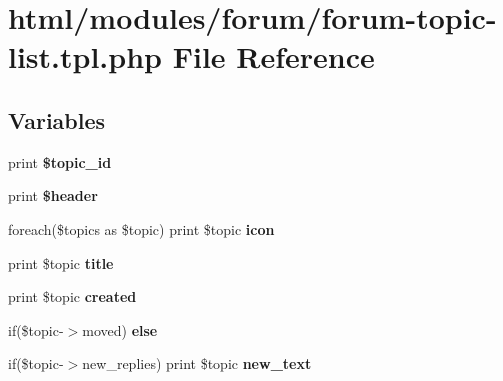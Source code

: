 \hypertarget{forum-topic-list_8tpl_8php}{
\section{html/modules/forum/forum-\/topic-\/list.tpl.php File Reference}
\label{forum-topic-list_8tpl_8php}
}
\subsection*{Variables}
\begin{DoxyCompactItemize}
\item 
\hypertarget{forum-topic-list_8tpl_8php_ad63adef8ed61a62f2c83572cd6273445}{
print {\bfseries \$topic\_\-id}}
\label{forum-topic-list_8tpl_8php_ad63adef8ed61a62f2c83572cd6273445}

\item 
\hypertarget{forum-topic-list_8tpl_8php_afdbae16fe43949b38217397064ddaf03}{
print {\bfseries \$header}}
\label{forum-topic-list_8tpl_8php_afdbae16fe43949b38217397064ddaf03}

\item 
\hypertarget{forum-topic-list_8tpl_8php_a77e5d07abebe3261741e5786016785e0}{
foreach(\$topics as \$topic) print \$topic {\bfseries icon}}
\label{forum-topic-list_8tpl_8php_a77e5d07abebe3261741e5786016785e0}

\item 
\hypertarget{forum-topic-list_8tpl_8php_a72edd12ee8bba1e113c562a074d20bfd}{
print \$topic {\bfseries title}}
\label{forum-topic-list_8tpl_8php_a72edd12ee8bba1e113c562a074d20bfd}

\item 
\hypertarget{forum-topic-list_8tpl_8php_aef00d19b024cca51c2589602fd667f2e}{
print \$topic {\bfseries created}}
\label{forum-topic-list_8tpl_8php_aef00d19b024cca51c2589602fd667f2e}

\item 
\hypertarget{forum-topic-list_8tpl_8php_a03febd59c2d78f68da28db70f0873f2b}{
if(\$topic-\/$>$moved) {\bfseries else}}
\label{forum-topic-list_8tpl_8php_a03febd59c2d78f68da28db70f0873f2b}

\item 
\hypertarget{forum-topic-list_8tpl_8php_a32a751e033725f54390f66ac625aaf99}{
if(\$topic-\/$>$new\_\-replies) print \$topic {\bfseries new\_\-text}}
\label{forum-topic-list_8tpl_8php_a32a751e033725f54390f66ac625aaf99}


\end{DoxyCompactItemize}
